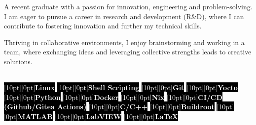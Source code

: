 \documentclass[9pt]{./packages/Developer_CV/developercv}
\begin{document}
\noindent %
\begin{minipage}[t]{0.60\textwidth} %

    \raggedright

    A recent graduate with a passion for innovation, engineering and
    problem-solving. I am eager to pursue a career in research and development (R\&D),
    where I can contribute to fostering innovation and further my
    technical skills.

    Thriving in collaborative environments, I enjoy brainstorming and working in
    a team, where exchanging ideas and leveraging collective strengths leads to
    creative solutions.

\end{minipage}
\hfill %
\begin{minipage}[t]{0.35\textwidth}
    \raggedright %
    \\
    \colorbox{black}{\textcolor{white}{\raisebox{0.5ex}[10pt][0pt]{\textbf{Linux}}}}
    \colorbox{black}{\textcolor{white}{\raisebox{0.5ex}[10pt][0pt]{\textbf{Shell Scripting}}}}
    \colorbox{black}{\textcolor{white}{\raisebox{0.5ex}[10pt][0pt]{\textbf{Git}}}}
    \colorbox{black}{\textcolor{white}{\raisebox{0.5ex}[10pt][0pt]{\textbf{Yocto}}}}
    \colorbox{black}{\textcolor{white}{\raisebox{0.5ex}[10pt][0pt]{\textbf{Python}}}}
    \colorbox{black}{\textcolor{white}{\raisebox{0.5ex}[10pt][0pt]{\textbf{Docker}}}}
    \colorbox{black}{\textcolor{white}{\raisebox{0.5ex}[10pt][0pt]{\textbf{Nix}}}}
    \colorbox{black}{\textcolor{white}{\raisebox{0.5ex}[10pt][0pt]{\textbf{CI/CD (Github/Gitea Actions)}}}}
    \colorbox{black}{\textcolor{white}{\raisebox{0.5ex}[10pt][0pt]{\textbf{C/C++}}}}
    \colorbox{black}{\textcolor{white}{\raisebox{0.5ex}[10pt][0pt]{\textbf{Buildroot}}}}
    \colorbox{black}{\textcolor{white}{\raisebox{0.5ex}[10pt][0pt]{\textbf{MATLAB}}}}
    \colorbox{black}{\textcolor{white}{\raisebox{0.5ex}[10pt][0pt]{\textbf{LabVIEW}}}}
    \colorbox{black}{\textcolor{white}{\raisebox{0.5ex}[10pt][0pt]{\textbf{LaTeX}}}}
    \\
\end{minipage}

\end{document}
